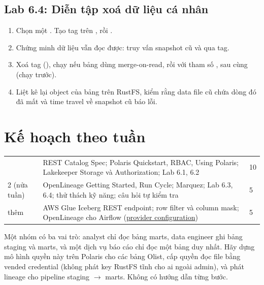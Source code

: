 \subsection{Lab 6.4: Diễn tập xoá dữ liệu cá nhân}
\begin{enumerate}
  \item Chọn một . Tạo tag  trên , rồi .
  \item Chứng minh dữ liệu vẫn đọc được: truy vấn  snapshot cũ và qua tag.
  \item Xoá tag (), chạy  nếu bảng dùng merge-on-read, rồi  với tham số , sau cùng  (chạy  trước).
  \item Liệt kê lại object của bảng trên RustFS, kiểm rằng data file cũ chứa dòng đó đã mất và time travel về snapshot cũ báo lỗi.
\end{enumerate}

\section{Kế hoạch theo tuần}
\begin{xltabular}{\textwidth}{@{}P{1.4cm} L P{1.4cm}@{}}
\toprule
{} &  &  \\
\midrule
\endhead
\bottomrule
{} & REST Catalog Spec; Polaris Quickstart, RBAC, Using Polaris; Lakekeeper Storage và Authorization; Lab 6.1, 6.2 & 10 \\
2 (nửa tuần) & OpenLineage Getting Started, Run Cycle; Marquez; Lab 6.3, 6.4; thử thách kỹ năng; câu hỏi tự kiểm tra & 5 \\
thêm & AWS Glue Iceberg REST endpoint; row filter và column mask; OpenLineage cho Airflow (\href{https://airflow.apache.org/docs/apache-airflow-providers-openlineage/stable/configurations-ref.html}{provider configuration}) & 5 \\
\end{xltabular}

\begin{thuthach}
Một nhóm có ba vai trò: analyst chỉ đọc bảng marts, data engineer ghi bảng staging và marts, và một dịch vụ báo cáo chỉ đọc một bảng duy nhất. Hãy dựng mô hình quyền này trên Polaris cho các bảng Olist, cấp quyền đọc file bằng vended credential (không phát key RustFS tĩnh cho ai ngoài admin), và phát lineage cho pipeline staging $\rightarrow$ marts. Không có hướng dẫn từng bước.
\end{thuthach}

